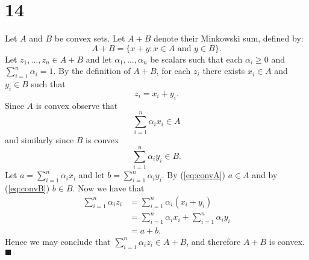\documentclass[letterpaper,12pt,oneside,onecolumn]{article}
\begin{document}
\section*{14}
Let $A$ and $B$ be convex sets. Let $A+B$ denote their Minkowski sum, defined by:
$$A+B = \{x+y : x\in A\text{ and } y\in B \}.$$
Let $z_1, \dots, z_n \in A+B$ and let $\alpha_1, \dots, \alpha_n$ be scalars such that each $\alpha_i \geq 0$ and $\sum_{i=1}^n \alpha_i = 1$. By the definition of $A+B$, for each $z_i$ there exists $x_i \in A$ and $y_i \in B$ such that $$z_i = x_i + y_i.$$
Since $A$ is convex observe that
\begin{equation}
\sum_{i=1}^n \alpha_i x_i \in A
\label{eq:convA}
\end{equation}
and similarly since $B$ is convex
\begin{equation}
\sum_{i=1}^n \alpha_i y_i \in B.
\label{eq:convB}
\end{equation}
Let $a = \sum_{i=1}^n \alpha_i x_i$ and let $b = \sum_{i=1}^n \alpha_i y_i$. By (\ref{eq:convA}) $a\in A$ and by (\ref{eq:convB}) $b \in B$. Now we have that
\begin{align*}
\sum_{i=1}^n \alpha_i z_i &= \sum_{i=1}^n \alpha_i(x_i + y_i) \\
&= \sum_{i=1}^n \alpha_i x_i + \sum_{i=1}^n \alpha_i y_i \\
&= a + b.
\end{align*}
Hence we may conclude that $\sum_{i=1}^n \alpha_i z_i \in A + B$, and therefore $A+B$ is convex. $\blacksquare$
\end{document}
